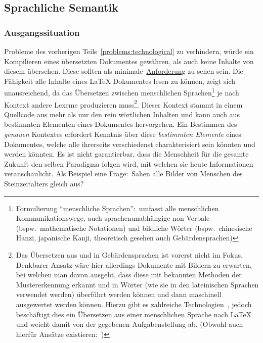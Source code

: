 


\subsection{Sprachliche Semantik}\label{problems:linguistical}
\subsubsection{Ausgangssituation}
Probleme des vorherigen Teils~\ref{problems:technological} zu verhindern, würde ein Kompilieren eines übersetzten Dokumentes gewähren, als auch keine Inhalte von diesem übersehen. Diese sollten als minimale~\hyperref[technologies:demands]{Anforderung} zu sehen sein. Die Fähigkeit alle Inhalte eines \LaTeX{} Dokumentes lesen zu können, zeigt sich unausreichend, da das Übersetzen zwischen menschlichen Sprachen\footnote{Formulierung \enquote{menschliche Sprachen}:\ umfasst alle menschlichen Kommunikationswege, auch sprachenunabhängige non-Verbale (bspw.\ mathematische Notationen) und bildliche Wörter (bspw.\ chinesische Hanzi, japanische Kanji, theoretisch gesehen auch Gebärdensprachen)} je nach Kontext andere Lexeme produzieren muss\footnote{Das Übersetzen aus und in Gebärdensprachen ist vorerst nicht im Fokus. Denkbarer Ansatz wäre hier allerdings Dokumente mit Bildern zu erwarten, bei welchen man davon ausgeht, dass diese mit bekannten Methoden der Mustererkennung erkannt und in Wörter (wie sie in den lateinischen Sprachen verwendet werden) überführt werden können und dann maschinell ausgewertet werden können. Hierzu gibt es zahlreiche Technologien~\citep{expertSystemsWithApplications:rastgooRazie2021:signLanguageRecognitionADeepSurvey}, jedoch beschäftigt dies ein Übersetzen aus einer menschlichen Sprache nach \LaTeX{} und weicht damit von der gegebenen Aufgabenstellung ab. (Obwohl auch hierfür Ansätze existieren:~\cite{cornellComputerScienceComputerVisionPatternRecognition:korzhDmitrii2025:speechToLaTeXnewModelsAndDatasetsForConvertingSpokenEquationsAndSentences})}.
Dieser Kontext stammt in einem Quellcode aus mehr als nur den rein wörtlichen Inhalten und kann auch aus bestimmten Elementen eines Dokumentes hervorgehen. 
Ein Bestimmen des \textit{genauen} Kontextes erfordert Kenntnis über diese \textit{bestimmten Elemente} eines Dokumentes, welche alle ihrerseits verschiedenst charakterisiert sein könnten und werden könnten. Es ist nicht garantierbar, dass die Menschheit für die gesamte Zukunft den selben Paradigma folgen wird, mit welchen sie heute Informationen veranschaulicht. Als Beispiel eine Frage:\ Sahen alle Bilder von Menschen des Steinzeitalters gleich aus?\\

